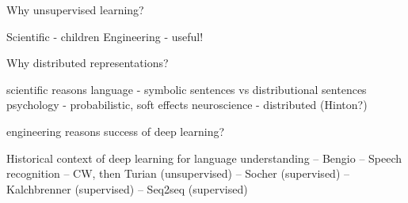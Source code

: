 
Why unsupervised learning? 

Scientific - children
Engineering - useful!



Why distributed representations?

scientific reasons
language - symbolic sentences vs distributional sentences
psychology - probabilistic, soft effects
neuroscience - distributed (Hinton?)

engineering reasons
success of deep learning?

Historical context of deep learning for language understanding
-- Bengio
-- Speech recognition
-- CW, then Turian (unsupervised)
-- Socher (supervised)
-- Kalchbrenner (supervised)
-- Seq2seq (supervised)

